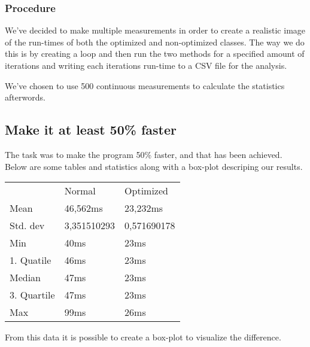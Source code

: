 \documentclass{article}
\begin{document}
\subsubsection*{Procedure}
We've decided to make multiple measurements in order to create a realistic image 
of the run-times of both the optimized and non-optimized classes. The way we do this
is by creating a loop and then run the two methods for a specified amount of iterations
and writing each iterations run-time to a CSV file for the analysis. 

We've chosen to use 500 continuous measurements to calculate the statistics afterwords.


\subsection{Make it at least 50\% faster}
The task was to make the program 50\% faster, and that has been achieved. 
Below are some tables and statistics along with a box-plot descriping our results.

\begin{tabular}{ l l l }
                & Normal        & Optimized \\ 
    Mean        & 46,562ms      & 23,232ms \\  
    Std. dev    & 3,351510293   & 0,571690178 \\
    Min         & 40ms          & 23ms \\
    1. Quatile  & 46ms          & 23ms \\
    Median      & 47ms          & 23ms \\
    3. Quartile & 47ms          & 23ms \\
    Max         & 99ms          & 26ms    
\end{tabular}

 
From this data it is possible to create a box-plot to visualize the difference. 
\newline

\end{document}
